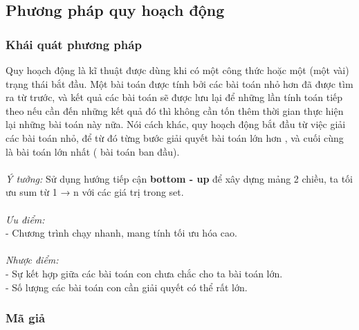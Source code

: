 \documentclass[a4paper]{article}
\newcommand\tab[1][1cm]{\hspace*{#1}}
\begin{document}
\subsection{Phương pháp quy hoạch động }
\subsubsection{Khái quát phương pháp}
Quy hoạch động là kĩ thuật được dùng khi có một công thức hoặc một (một vài)
trạng thái bắt đầu. Một bài toán được tính bởi các bài toán nhỏ hơn đã được tìm
ra từ trước, và kết quả các bài toán sẽ được lưu lại để những lần tính toán tiếp
theo nếu cần đến những kết quả đó thì không cần tốn thêm thời gian thực hiện lại những bài toán này nữa. Nói cách khác, quy hoạch động bắt đầu từ việc giải các
bài toán nhỏ, để từ đó từng bước giải quyết bài toán lớn hơn , và cuối cùng là bài
toán lớn nhất ( bài toán ban đầu).\\ \\

\textit{Ý tưởng:} Sử dụng hướng tiếp cận\textbf{ bottom - up} để xây dựng mảng 2 chiều, ta tối ưu sum từ 1 → n với các giá trị trong set.\\ \\
\textit{Ưu điểm: }\\
\tab - Chương trình chạy nhanh,
mang tính tối ưu hóa cao.\\ \\
\textit{Nhược điểm:}\\
\tab - Sự kết hợp giữa các bài toán con chưa chắc cho ta bài toán lớn.\\
\tab - Số lượng các bài toán con cần giải quyết có thể rất lớn.

\subsubsection{Mã giả}
\end{document}
